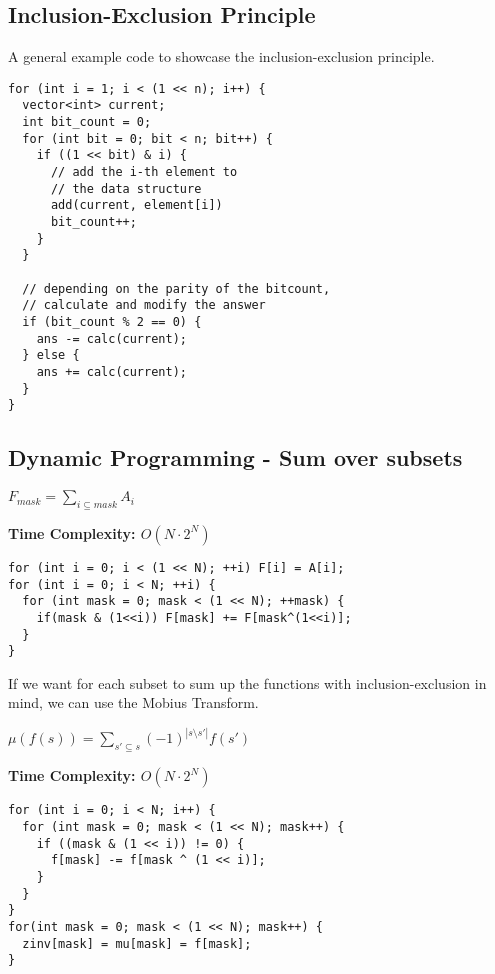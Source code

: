 \newpage
\subsection{Inclusion-Exclusion Principle}

A general example code to showcase the inclusion-exclusion principle.

\begin{lstlisting}
for (int i = 1; i < (1 << n); i++) {
  vector<int> current;
  int bit_count = 0;
  for (int bit = 0; bit < n; bit++) {
    if ((1 << bit) & i) {
      // add the i-th element to
      // the data structure
      add(current, element[i])
      bit_count++;
    }
  }

  // depending on the parity of the bitcount,
  // calculate and modify the answer
  if (bit_count % 2 == 0) {
    ans -= calc(current);
  } else {
    ans += calc(current);
  }
}

\end{lstlisting}

\subsection{Dynamic Programming - Sum over subsets}

\begin{center}
$\displaystyle F_{mask} = \sum_{i \subseteq mask}^{} A_i$
\end{center}

\textbf{Time Complexity: $O(N \cdot 2^N)$}

\begin{lstlisting}
for (int i = 0; i < (1 << N); ++i) F[i] = A[i];
for (int i = 0; i < N; ++i) {
  for (int mask = 0; mask < (1 << N); ++mask) {
  	if(mask & (1<<i)) F[mask] += F[mask^(1<<i)];
  }
}
\end{lstlisting}

If we want for each subset to sum up the functions with inclusion-exclusion in mind, we can use the Mobius Transform.

\begin{center}
  $\displaystyle \mu(f(s)) = \sum_{s' \subseteq s} (-1)^{|s \setminus s'|} f(s')$
\end{center}

\textbf{Time Complexity: $O(N \cdot 2^N)$}

\begin{lstlisting}
for (int i = 0; i < N; i++) {
  for (int mask = 0; mask < (1 << N); mask++) {
    if ((mask & (1 << i)) != 0) {
      f[mask] -= f[mask ^ (1 << i)];
    }
  }
}
for(int mask = 0; mask < (1 << N); mask++) {
  zinv[mask] = mu[mask] = f[mask];
}
\end{lstlisting}

